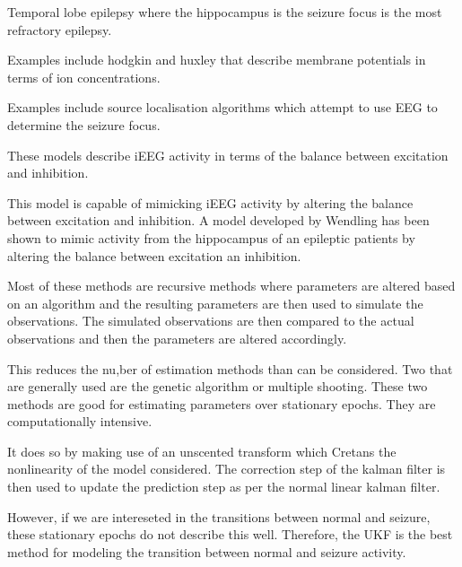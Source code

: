 	Temporal lobe epilepsy where the hippocampus is the seizure focus is the most refractory epilepsy. 

	Examples include hodgkin and huxley that describe membrane potentials in terms of ion concentrations.

	Examples include source localisation algorithms which attempt to use EEG to determine the seizure focus.

	These models describe iEEG activity in terms of the balance between excitation and inhibition.
	
  This model is capable of mimicking iEEG activity by altering the balance between excitation and inhibition.
  A model developed by Wendling has been shown to mimic activity from the hippocampus of an epileptic patients by altering the balance between excitation an inhibition.

	Most of these methods are recursive methods where parameters are altered based on an algorithm and the resulting parameters are then used to simulate the observations. 
	The simulated observations are then compared to the actual observations and then the parameters are altered accordingly.

	This reduces the nu,ber of estimation methods than can be considered.
	Two that are generally used are the genetic algorithm or multiple shooting.
	These two methods are good for estimating parameters over stationary epochs.
	They are computationally intensive.

	It does so by making use of an unscented transform which Cretans the nonlinearity of the model considered.
	The correction step of the kalman filter is then used to update the prediction step as per the normal linear kalman filter.

	However, if we are intereseted in the transitions between normal and seizure, these stationary epochs do not describe this well.
	Therefore, the UKF is the best method for modeling the transition between normal and seizure activity. 

